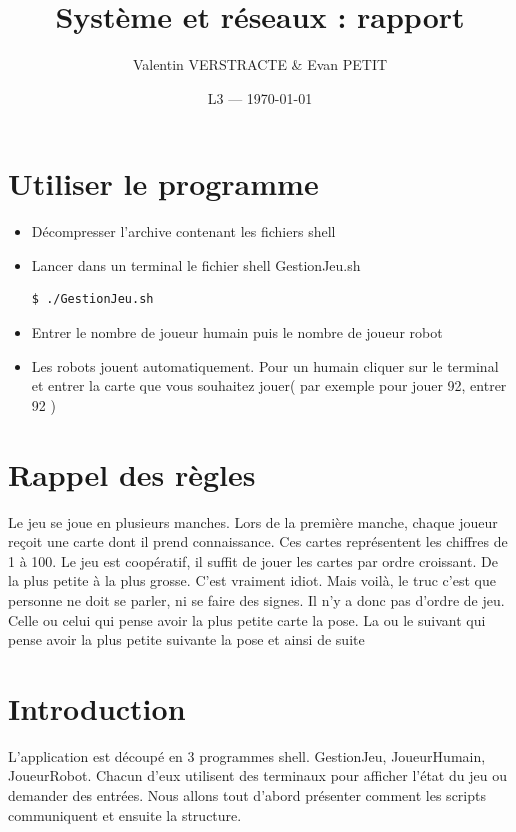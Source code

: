 \documentclass{article}
\title{Système et réseaux : rapport} %
\author{Valentin VERSTRACTE \& Evan PETIT}
\date{L3 --- \today} %
\begin{document}
\maketitle %

\bigskip
\bigskip
\renewcommand{\contentsname}{Table des matières}
\tableofcontents
\newpage

\section*{Utiliser le programme}
%
\begin{itemize}
	\item Décompresser l'archive contenant les fichiers shell
	\item Lancer dans un terminal le fichier shell GestionJeu.sh
	\begin{lstlisting}[language=bash]
 		$ ./GestionJeu.sh
	\end{lstlisting}
	\item Entrer le nombre de joueur humain puis le nombre de joueur robot
	\item Les robots jouent automatiquement. Pour un humain cliquer sur le terminal et entrer la carte que vous souhaitez jouer( par exemple pour jouer 92, entrer 92 )
	
\end{itemize}

\section*{Rappel des règles}
%
Le jeu se joue en plusieurs manches. Lors de la première manche,
chaque joueur reçoit une carte dont il prend connaissance. Ces cartes représentent les chiffres de 1 à 100. Le jeu est coopératif, il suffit de jouer les cartes par ordre croissant. De la plus petite à la plus grosse. C’est vraiment idiot. Mais voilà, le truc c’est que personne ne doit se parler, ni se faire des signes. Il n’y a donc pas d’ordre de jeu. Celle ou celui qui pense avoir la plus petite carte la pose. La ou le suivant qui pense avoir la plus petite suivante la pose et ainsi de suite

\section*{Introduction}
%
L'application est découpé en 3 programmes shell. GestionJeu, JoueurHumain, JoueurRobot. Chacun d'eux utilisent des terminaux pour afficher l'état du jeu ou demander des entrées. Nous allons tout d'abord présenter comment les scripts communiquent et ensuite la structure.
\end{document}
